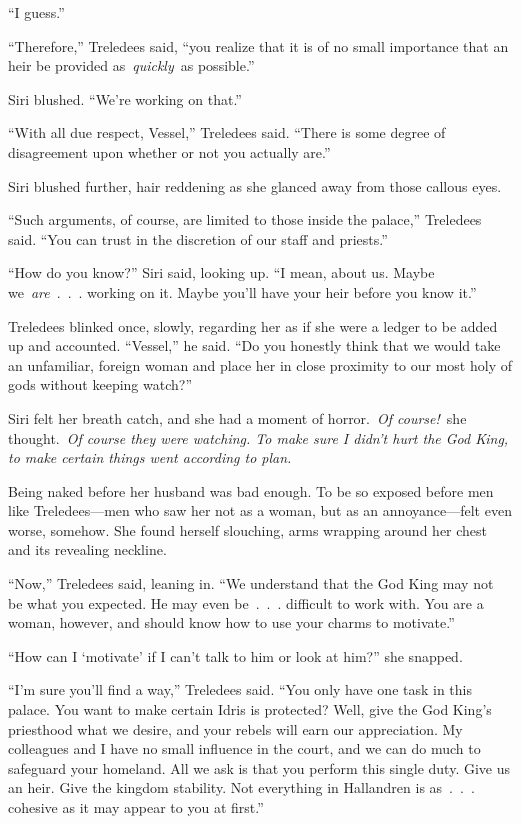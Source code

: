“I guess.”

“Therefore,” Treledees said, “you realize that it is of no small importance that an heir be provided as~\textit{quickly}~as possible.”

Siri blushed. “We’re working on that.”

“With all due respect, Vessel,” Treledees said. “There is some degree of disagreement upon whether or not you actually are.”

Siri blushed further, hair reddening as she glanced away from those callous eyes.

“Such arguments, of course, are limited to those inside the palace,” Treledees said. “You can trust in the discretion of our staff and priests.”

“How do you know?” Siri said, looking up. “I mean, about us. Maybe we~\textit{are}~.~.~. working on it. Maybe you’ll have your heir before you know it.”

Treledees blinked once, slowly, regarding her as if she were a ledger to be added up and accounted. “Vessel,” he said. “Do you honestly think that we would take an unfamiliar, foreign woman and place her in close proximity to our most holy of gods without keeping watch?”

Siri felt her breath catch, and she had a moment of horror.~\textit{Of course!}~she thought.~\textit{Of course they were watching. To make sure I didn’t hurt the God King, to make certain things went according to plan.}

Being naked before her husband was bad enough. To be so exposed before men like Treledees—men who saw her not as a woman, but as an annoyance—felt even worse, somehow. She found herself slouching, arms wrapping around her chest and its revealing neckline.

“Now,” Treledees said, leaning in. “We understand that the God King may not be what you expected. He may even be~.~.~. difficult to work with. You are a woman, however, and should know how to use your charms to motivate.”

“How can I ‘motivate’ if I can’t talk to him or look at him?” she snapped.

“I’m sure you’ll find a way,” Treledees said. “You only have one task in this palace. You want to make certain Idris is protected? Well, give the God King’s priesthood what we desire, and your rebels will earn our appreciation. My colleagues and I have no small influence in the court, and we can do much to safeguard your homeland. All we ask is that you perform this single duty. Give us an heir. Give the kingdom stability. Not everything in Hallandren is as~.~.~. cohesive as it may appear to you at first.”

